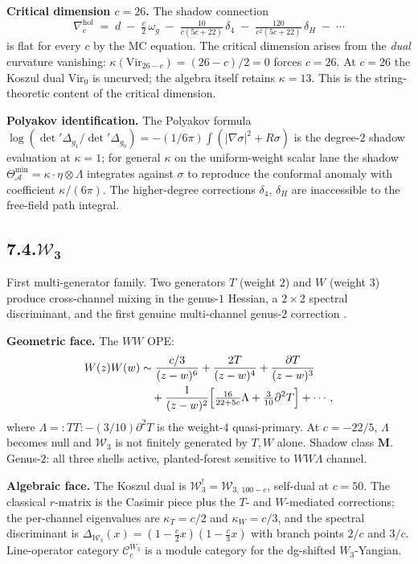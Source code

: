 \documentclass[11pt]{report}
\theoremstyle{definition}
\theoremstyle{remark}
\providecommand{\cA}{\mathcal{A}}
\providecommand{\cC}{\mathcal{C}}
\providecommand{\cW}{\mathcal{W}}
\providecommand{\hol}{\mathrm{hol}}
\providecommand{\Vir}{\mathrm{Vir}}
\numberwithin{equation}{section}
\begin{document}
\medskip\noindent\textbf{Critical dimension $c = 26$.} The
shadow connection
\[
\nabla^{\hol}_c
\;=\;
d \;-\; \tfrac{c}{2}\,\omega_g
\;-\; \tfrac{10}{c(5c+22)}\,\delta_4
\;-\; \tfrac{120}{c^2(5c+22)}\,\delta_H
\;-\; \cdots
\]
is flat for every $c$ by the MC equation. The critical
dimension arises from the \emph{dual} curvature vanishing:
$\kappa(\Vir_{26-c}) = (26-c)/2 = 0$ forces $c = 26$. At
$c = 26$ the Koszul dual $\Vir_0$ is uncurved; the algebra
itself retains $\kappa = 13$. This is the string-theoretic
content of the critical dimension.

\medskip\noindent\textbf{Polyakov identification.} The
Polyakov formula $\log(\det'\Delta_{g_1}/\det'\Delta_{g_0})
= -(1/6\pi)\int(|\nabla\sigma|^2 + R\sigma)$ is the degree-$2$
shadow evaluation at $\kappa = 1$; for general $\kappa$ on
the uniform-weight scalar lane the shadow
$\Theta^{\min}_\cA = \kappa\cdot\eta\otimes\Lambda$ integrates
against $\sigma$ to reproduce the conformal anomaly with
coefficient $\kappa/(6\pi)$. The higher-degree corrections
$\delta_4$, $\delta_H$ are inaccessible to the free-field path
integral.

\subsection*{7.4.\quad $\boldsymbol{\cW_3}$}

First multi-generator family. Two generators $T$ (weight $2$)
and $W$ (weight $3$) produce cross-channel mixing in the
genus-$1$ Hessian, a $2 \times 2$ spectral discriminant, and
the first genuine multi-channel genus-$2$ correction .

\medskip\noindent\textbf{Geometric face.} The $WW$ OPE:
\begin{align*}
W(z) W(w)
&\sim \frac{c/3}{(z-w)^6}
+ \frac{2T}{(z-w)^4}
+ \frac{\partial T}{(z-w)^3}\\
&\quad + \frac{1}{(z-w)^2}\Bigl[\tfrac{16}{22+5c}\Lambda
+ \tfrac{3}{10}\partial^2 T\Bigr] + \cdots,
\end{align*}
where $\Lambda = :TT: - (3/10)\partial^2 T$ is the
weight-$4$ quasi-primary. At $c = -22/5$, $\Lambda$ becomes
null and $\cW_3$ is not finitely generated by $T, W$ alone.
Shadow class $\mathbf M$. Genus-$2$: all three shells
active, planted-forest sensitive to $WW\Lambda$ channel.

\medskip\noindent\textbf{Algebraic face.} The Koszul dual is
$\cW_3^! = \cW_{3,\,100-c}$, self-dual at $c = 50$. The
classical $r$-matrix is the Casimir piece plus the $T$-
and $W$-mediated corrections; the per-channel eigenvalues
are $\kappa_T = c/2$ and $\kappa_W = c/3$, and the
spectral discriminant is
$\Delta_{\cW_3}(x) = (1 - \tfrac{c}{2}x)(1 - \tfrac{c}{3}x)$
with branch points $2/c$ and $3/c$. Line-operator category
$\cC_c^{W_3}$ is a module category for the dg-shifted
$W_3$-Yangian.
\end{document}
